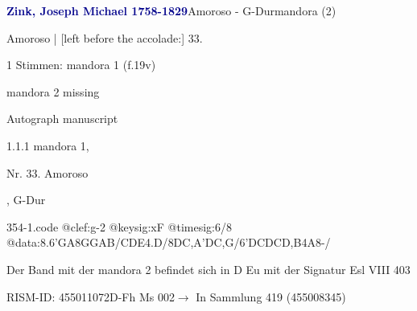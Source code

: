 \documentclass[twocolumn]{book}
\begin{document}
\par \vspace{7pt} \textcolor{darkblue}{\textbf{Zink, Joseph Michael  1758-1829}}\hfillplus{\textbf{[354]}}\newline Amoroso - G-Dur\newline mandora (2)
\par \begin{itshape}[f.19v, at left:] Amoroso | [left before the accolade:] 33.\end{itshape} 
\par \textcolor{darkblue}{}  1 Stimmen: mandora 1  (f.19v)\newline \begin{small} mandora 2 missing\end{small} \newline Autograph manuscript
\par 1.1.1  mandora 1, \begin{itshape}Nr. 33. Amoroso\end{itshape}, G-Dur  
\begin{filecontents*}{354-1.code}
@clef:g-2
@keysig:xF
@timesig:6/8
@data:{8.6'GA8G}{GAB}/{CDE}4.D/{8DC,A}{'DC,G}/{6'DCDCD,B}4A8-/
\end{filecontents*}
\newline
%
\par Der Band mit der mandora 2 befindet sich in D Eu mit der Signatur Esl VIII 403
\par RISM-ID: 455011072\newline D-Fh  Ms 002\newline $\rightarrow$ In Sammlung 419 (455008345)
      
\end{document}
